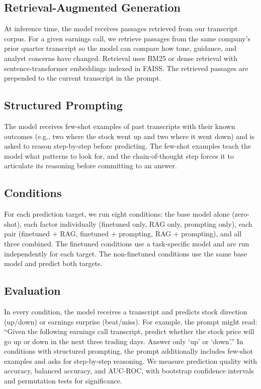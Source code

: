 \documentclass[11pt]{article}
\begin{document}
\subsection{Retrieval-Augmented Generation}

At inference time, the model receives passages retrieved from our transcript corpus. For a given earnings call, we retrieve passages from the same company's prior quarter transcript so the model can compare how tone, guidance, and analyst concerns have changed. Retrieval uses BM25 or dense retrieval with sentence-transformer embeddings \citep{Reimers2019} indexed in FAISS. The retrieved passages are prepended to the current transcript in the prompt.

\subsection{Structured Prompting}

The model receives few-shot examples of past transcripts with their known outcomes (e.g., two where the stock went up and two where it went down) and is asked to reason step-by-step before predicting. The few-shot examples teach the model what patterns to look for, and the chain-of-thought step forces it to articulate its reasoning before committing to an answer.

\subsection{Conditions}

For each prediction target, we run eight conditions: the base model alone (zero-shot), each factor individually (finetuned only, RAG only, prompting only), each pair (finetuned + RAG, finetuned + prompting, RAG + prompting), and all three combined. The finetuned conditions use a task-specific model and are run independently for each target. The non-finetuned conditions use the same base model and predict both targets.

\subsection{Evaluation}

In every condition, the model receives a transcript and predicts stock direction (up/down) or earnings surprise (beat/miss). For example, the prompt might read: ``Given the following earnings call transcript, predict whether the stock price will go up or down in the next three trading days. Answer only `up' or `down'.'' In conditions with structured prompting, the prompt additionally includes few-shot examples and asks for step-by-step reasoning. We measure prediction quality with accuracy, balanced accuracy, and AUC-ROC, with bootstrap confidence intervals and permutation tests for significance.
\end{document}
